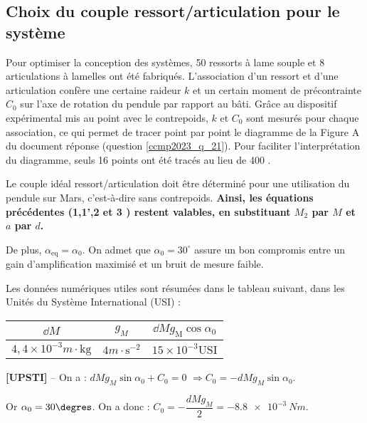 \subsection{Choix du couple ressort/articulation pour le système}
\ifprof
\else
Pour optimiser la conception des systèmes, 50 ressorts à lame souple et 8 articulations à lamelles ont été fabriqués. L'association d'un ressort et d'une articulation confère une certaine raideur $k$ et un certain moment de précontrainte $C_{0}$ sur l'axe de rotation du pendule par rapport au bâti. Grâce au dispositif expérimental mis au point avec le contrepoids, $k$ et $C_{0}$ sont mesurés pour chaque association, ce qui permet de tracer point par point le diagramme de la Figure A du document réponse (question \ref{ccmp2023_q_21}). Pour faciliter l'interprétation du diagramme, seuls 16 points ont été tracés au lieu de 400 .

Le couple idéal ressort/articulation doit être déterminé pour une utilisation du pendule sur Mars, c'est-à-dire sans contrepoids. \textbf{Ainsi, les équations précédentes (1,1',2 et 3 ) restent valables, en substituant $M_{2}$ par $M$ et $a$ par $d$.}

De plus, $\alpha_{\mathrm{eq}}=\alpha_{0}$. On admet que $\alpha_{0}=30^{\circ}$ assure un bon compromis entre un gain d'amplification maximisé et un bruit de mesure faible.

Les données numériques utiles sont résumées dans le tableau suivant, dans les Unités du Système International (USI) :

\begin{center}
\begin{tabular}{|c|c|c|}
\hline
$\dd M$ & $g_{M}$ & $\dd M g_{\mathrm{M}} \cos \alpha_{0}$ \\
\hline
$4,4 \times 10^{-3} \si{m} \cdot \mathrm{kg}$ & $4 \si{m} \cdot \mathrm{s}^{-2}$ & $15 \times 10^{-3} \mathrm{USI}$ \\
\hline
\end{tabular}
\end{center}
\fi

\ifprof
\begin{corrige}\textbf{[UPSTI]} --
On a : $dMg_M \sin \alpha_0+C_0=0$  
$\Rightarrow C_0=-dMg_M \sin\alpha_0$.

Or $\alpha_0=30\degres$. On a donc :
$C_0=-\dfrac{dMg_M}{2}=-\SI{8,8e-3}{Nm}$.

\end{corrige}
\else
\fi



